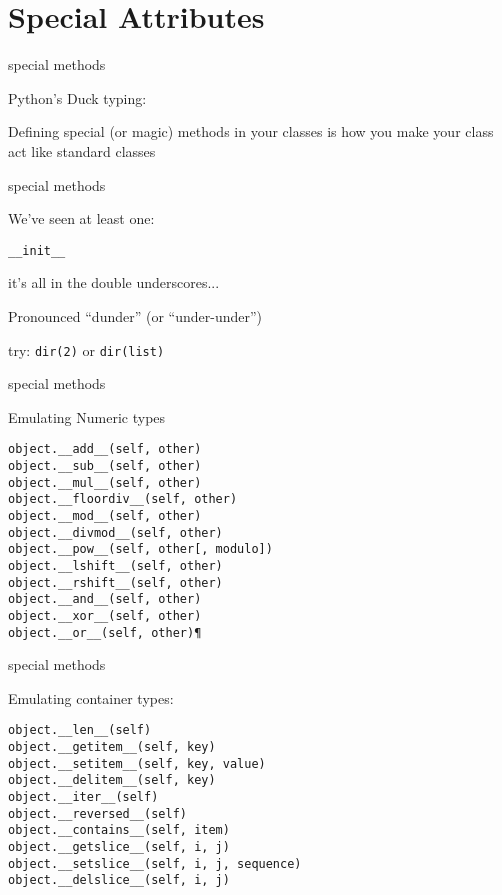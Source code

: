 \documentclass{beamer}
\begin{document}
\section{Special Attributes}

\begin{frame}[fragile]{special methods}

{\Large Python's Duck typing:}

\vfill
{\Large Defining special (or magic) methods in your classes is how you make
your class act like standard classes}

\end{frame} 

\begin{frame}[fragile]{special methods}

{\Large We've seen at least one:}

\begin{verbatim}
__init__
\end{verbatim}

\vfill
{\large it's all in the double underscores...}

\vfill
{\large Pronounced ``dunder'' (or ``under-under'') }

\vfill
try: \verb|dir(2)| or \verb|dir(list)|
\end{frame} 

\begin{frame}[fragile]{special methods}

{\Large Emulating Numeric types}

\begin{verbatim}
object.__add__(self, other)
object.__sub__(self, other)
object.__mul__(self, other)
object.__floordiv__(self, other)
object.__mod__(self, other)
object.__divmod__(self, other)
object.__pow__(self, other[, modulo])
object.__lshift__(self, other)
object.__rshift__(self, other)
object.__and__(self, other)
object.__xor__(self, other)
object.__or__(self, other)¶
\end{verbatim}

\end{frame} 

\begin{frame}[fragile]{special methods}

{\Large Emulating container types:}

\begin{verbatim}
object.__len__(self)
object.__getitem__(self, key)
object.__setitem__(self, key, value)
object.__delitem__(self, key)
object.__iter__(self)
object.__reversed__(self)
object.__contains__(self, item)
object.__getslice__(self, i, j)
object.__setslice__(self, i, j, sequence)
object.__delslice__(self, i, j)
\end{verbatim}

\end{frame} 
\end{document}
